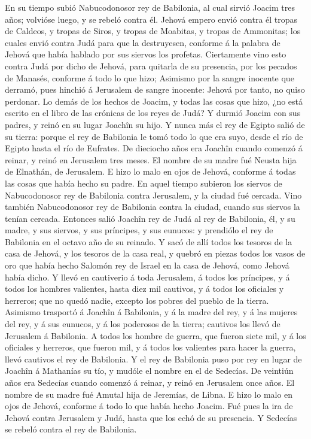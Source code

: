  En su tiempo subió Nabucodonosor rey de Babilonia, al
cual sirvió Joacim tres años; volvióse luego, y se rebeló contra él.
 Jehová empero envió contra él tropas de Caldeos, y tropas
de Siros, y tropas de Moabitas, y tropas de Ammonitas; los cuales envió
contra Judá para que la destruyesen, conforme á la palabra de Jehová que
había hablado por sus siervos los profetas.  Ciertamente
vino esto contra Judá por dicho de Jehová, para quitarla de su
presencia, por los pecados de Manasés, conforme á todo lo que hizo;
 Asimismo por la sangre inocente que derramó, pues hinchió
á Jerusalem de sangre inocente: Jehová por tanto, no quiso perdonar.
 Lo demás de los hechos de Joacim, y todas las cosas que
hizo, ¿no está escrito en el libro de las crónicas de los reyes de Judá?
 Y durmió Joacim con sus padres, y reinó en su lugar
Joachîn su hijo.  Y nunca más el rey de Egipto salió de su
tierra: porque el rey de Babilonia le tomó todo lo que era suyo, desde
el río de Egipto hasta el río de Eufrates.  De dieciocho
años era Joachîn cuando comenzó á reinar, y reinó en Jerusalem tres
meses. El nombre de su madre fué Neusta hija de Elnathán, de Jerusalem.
 E hizo lo malo en ojos de Jehová, conforme á todas las
cosas que había hecho su padre.  En aquel tiempo subieron
los siervos de Nabucodonosor rey de Babilonia contra Jerusalem, y la
ciudad fué cercada.  Vino también Nabucodonosor rey de
Babilonia contra la ciudad, cuando sus siervos la tenían cercada.
 Entonces salió Joachîn rey de Judá al rey de Babilonia,
él, y su madre, y sus siervos, y sus príncipes, y sus eunucos: y
prendiólo el rey de Babilonia en el octavo año de su reinado.
 Y sacó de allí todos los tesoros de la casa de Jehová, y
los tesoros de la casa real, y quebró en piezas todos los vasos de oro
que había hecho Salomón rey de Israel en la casa de Jehová, como Jehová
había dicho.  Y llevó en cautiverio á toda Jerusalem, á
todos los príncipes, y á todos los hombres valientes, hasta diez mil
cautivos, y á todos los oficiales y herreros; que no quedó nadie,
excepto los pobres del pueblo de la tierra.  Asimismo
trasportó á Joachîn á Babilonia, y á la madre del rey, y á las mujeres
del rey, y á sus eunucos, y á los poderosos de la tierra; cautivos los
llevó de Jerusalem á Babilonia.  A todos los hombre de
guerra, que fueron siete mil, y á los oficiales y herreros, que fueron
mil, y á todos los valientes para hacer la guerra, llevó cautivos el rey
de Babilonia.  Y el rey de Babilonia puso por rey en
lugar de Joachîn á Mathanías su tío, y mudóle el nombre en el de
Sedecías.  De veintiún años era Sedecías cuando comenzó á
reinar, y reinó en Jerusalem once años. El nombre de su madre fué Amutal
hija de Jeremías, de Libna.  E hizo lo malo en ojos de
Jehová, conforme á todo lo que había hecho Joacim.  Fué
pues la ira de Jehová contra Jerusalem y Judá, hasta que los echó de su
presencia. Y Sedecías se rebeló contra el rey de Babilonia.

